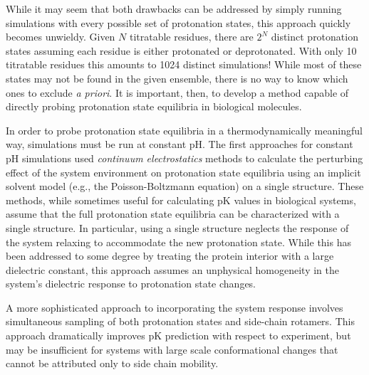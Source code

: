 While it may seem that both drawbacks can be addressed by simply running
simulations with every possible set of protonation states, this approach quickly
becomes unwieldy. Given $N$ titratable residues, there are $2^N$ distinct
protonation states assuming each residue is either protonated or deprotonated.
With only 10 titratable residues this amounts to 1024 distinct simulations!
While most of these states may not be found in the given ensemble, there is no
way to know which ones to exclude \emph{a priori}. It is important, then, to
develop a method capable of directly probing protonation state equilibria in
biological molecules.

In order to probe protonation state equilibria in a thermodynamically meaningful
way, simulations must be run at constant pH. The first approaches for constant
pH simulations used \emph{continuum electrostatics} methods to calculate the
perturbing effect of the system environment on protonation state equilibria
using an implicit solvent model (e.g., the Poisson-Boltzmann equation) on a
single structure. \cite{Bashford1990,Bashford1992,Antosiewicz1994} These
methods, while sometimes useful for calculating pK values in biological
systems, assume that the full protonation state equilibria can be characterized
with a single structure. In particular, using a single structure neglects the
response of the system relaxing to accommodate the new protonation state. While
this has been addressed to some degree by treating the protein interior with a
large dielectric constant, \cite{Antosiewicz1994} this approach assumes an
unphysical homogeneity in the system's dielectric response to protonation state
changes.

A more sophisticated approach to incorporating the system response involves
simultaneous sampling of both protonation states and side-chain rotamers.
\cite{Song2009} This approach dramatically improves pK prediction with
respect to experiment, but may be insufficient for systems with large scale
conformational changes that cannot be attributed only to side chain mobility.

